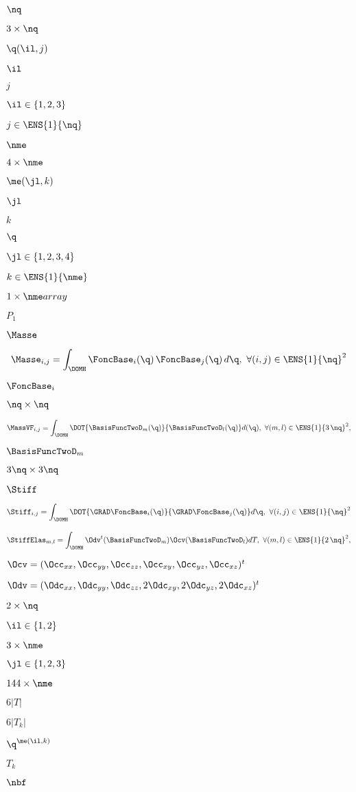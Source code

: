 \documentclass{article}
\begin{document}
$\nq$
\pagebreak

$3\times\nq$
\pagebreak

${\q}(\il,j)$
\pagebreak

$\il$
\pagebreak

$j$
\pagebreak

$\il\in\{1,2,3\}$
\pagebreak

$j\in\ENS{1}{\nq}$
\pagebreak

$\nme$
\pagebreak

$4\times\nme$
\pagebreak

$\me(\jl,k)$
\pagebreak

$\jl$
\pagebreak

$k$
\pagebreak

$\q$
\pagebreak

$\jl\in\{1,2,3,4\}$
\pagebreak

$k\in{\ENS{1}{\nme}}$
\pagebreak

$1\times\nme array$
\pagebreak

$P_1$
\pagebreak

$\Masse$
\pagebreak

\[\Masse_{i,j}=\int_\DOMH \FoncBase_i(\q)\, \FoncBase_j(\q)\, d\q,\ \forall (i,j)\in{\ENS{1}{\nq}}^2\]
\pagebreak

$\FoncBase_i$
\pagebreak

$\nq\times\nq$
\pagebreak

\[\MassVF_{i,j}=\int_\DOMH \DOT{\BasisFuncTwoD_m(\q)}{ \BasisFuncTwoD_l(\q)}d(\q), \ \forall (m,l)\in\ENS{1}{3\,\nq}^2,\]
\pagebreak

$\BasisFuncTwoD_m$
\pagebreak

$3\nq\times 3\nq$
\pagebreak

$\Stiff$
\pagebreak

\[\Stiff_{i,j}=\int_\DOMH \DOT{\GRAD\FoncBase_i(\q)}{\GRAD\FoncBase_j(\q)}d\q,\ \forall (i,j)\in{\ENS{1}{\nq}}^2\]
\pagebreak

\[\StiffElas_{m,l}=\int_{\DOMH} \Odv^t(\BasisFuncTwoD_m) \Ocv(\BasisFuncTwoD_l)dT, \ \forall (m,l)\in\ENS{1}{2\,\nq}^2,\]
\pagebreak

$\Ocv=(\Occ_{xx},\Occ_{yy},\Occ_{zz}, \Occ_{xy}, \Occ_{yz}, \Occ_{xz})^t$
\pagebreak

$\Odv=(\Odc_{xx},\Odc_{yy},\Odc_{zz},2\Odc_{xy},2\Odc_{yz},2\Odc_{xz})^t$
\pagebreak

$2\times\nq$
\pagebreak

$\il\in\{1,2\}$
\pagebreak

$3\times\nme$
\pagebreak

$\jl\in\{1,2,3\}$
\pagebreak

$144\times \nme$
\pagebreak

$6|T|$
\pagebreak

$6|T_k|$
\pagebreak

${\q}^{\me(\il,k)}$
\pagebreak

$T_k$
\pagebreak

$\nbf$
\pagebreak
\end{document}
